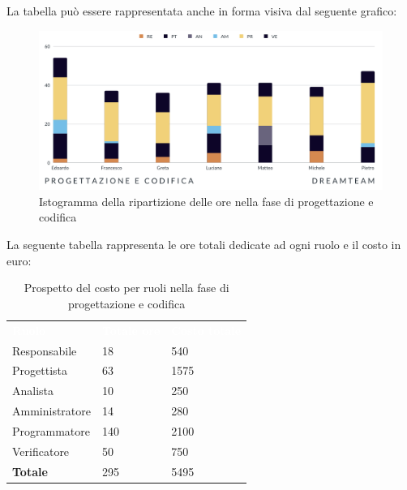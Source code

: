 La tabella può essere rappresentata anche in forma visiva dal seguente grafico:
\begin{figure}[!h]
\centering
\includegraphics[scale=0.65]{Sezioni/SezioniPreventivo/grafici/Progettazione_codifica.png}
\caption{Istogramma della ripartizione delle ore nella fase di progettazione e codifica}
\end{figure}

La seguente tabella rappresenta le ore totali dedicate ad ogni ruolo e il costo in euro:

\begin{table}[!htbp]
\begin{center}
\renewcommand{\arraystretch}{1.5}
\begin{tabular}{ m{}<{\centering}  m{}<{\centering} m{}<{\centering}}
	\rowcolor{darkblue}
	\textcolor{white}{\textbf{Ruolo}}&\textcolor{white}{\textbf{Totale ore}}&\textcolor{white}{\textbf{Costo totale}}\\ 

	Responsabile  & 18 & 540 \\	
	
	Progettista & 63 & 1575 \\
	
	Analista & 10 & 250 \\

	Amministratore & 14 & 280 \\
	
	Programmatore & 140 & 2100 \\
	
	Verificatore & 50 & 750 \\
	
	\textbf{Totale} & 295 & 5495 \\
	
\end{tabular}
\caption{Prospetto del costo per ruoli nella fase di progettazione e codifica}
\end{center}
\end{table}

